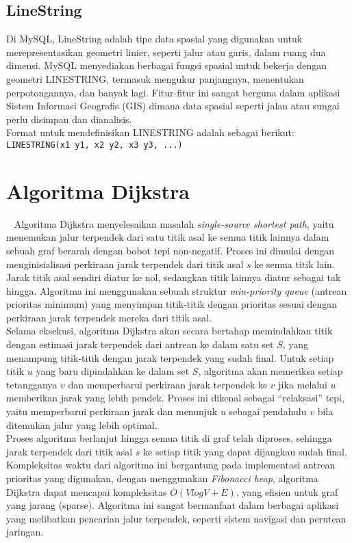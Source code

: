 \subsection{LineString}
\label{subs:linestring}
Di MySQL, LineString adalah tipe data spasial yang digunakan untuk merepresentasikan geometri linier, seperti jalur atau garis, dalam ruang dua dimensi. MySQL menyediakan berbagai fungsi spasial untuk bekerja dengan geometri LINESTRING, termasuk mengukur panjangnya, menentukan perpotongannya, dan banyak lagi. Fitur-fitur ini sangat berguna dalam aplikasi Sistem Informasi Geografis (GIS) dimana data spasial seperti jalan atau sungai perlu disimpan dan dianalisis. \\
Format untuk mendefinisikan LINESTRING adalah sebagai berikut: \\
\texttt{LINESTRING(x1 y1, x2 y2, x3 y3, ...)}

\newpage

\section{Algoritma Dijkstra}
\label{sec:dijkstra}
~\cite{Cormen:09:intro}
Algoritma Dijkstra menyelesaikan masalah \textit{single-source shortest path}, yaitu menemukan jalur terpendek dari satu titik asal ke semua titik lainnya dalam sebuah graf berarah dengan bobot tepi non-negatif. Proses ini dimulai dengan menginisialisasi perkiraan jarak terpendek dari titik asal $s$ ke semua titik lain. Jarak titik asal sendiri diatur ke nol, sedangkan titik lainnya diatur sebagai tak hingga. Algoritma ini menggunakan sebuah struktur \textit{min-priority queue} (antrean prioritas minimum) yang menyimpan titik-titik dengan prioritas sesuai dengan perkiraan jarak terpendek mereka dari titik asal.
\\
Selama eksekusi, algoritma Dijkstra akan secara bertahap memindahkan titik dengan estimasi jarak terpendek dari antrean ke dalam satu set $S$, yang menampung titik-titik dengan jarak terpendek yang sudah final. Untuk setiap titik $u$ yang baru dipindahkan ke dalam set $S$, algoritma akan memeriksa setiap tetangganya $v$ dan memperbarui perkiraan jarak terpendek ke $v$ jika melalui $u$ memberikan jarak yang lebih pendek. Proses ini dikenal sebagai “relaksasi” tepi, yaitu memperbarui perkiraan jarak dan menunjuk $u$ sebagai pendahulu $v$ bila ditemukan jalur yang lebih optimal.
\\
Proses algoritma berlanjut hingga semua titik di graf telah diproses, sehingga jarak terpendek dari titik asal $s$ ke setiap titik yang dapat dijangkau sudah final. Kompleksitas waktu dari algoritma ini bergantung pada implementasi antrean prioritas yang digunakan, dengan menggunakan \textit{Fibonacci heap}, algoritma Dijkstra dapat mencapai kompleksitas $O(VlogV+E)$, yang efisien untuk graf yang jarang (sparse). Algoritma ini sangat bermanfaat dalam berbagai aplikasi yang melibatkan pencarian jalur terpendek, seperti sistem navigasi dan perutean jaringan.

